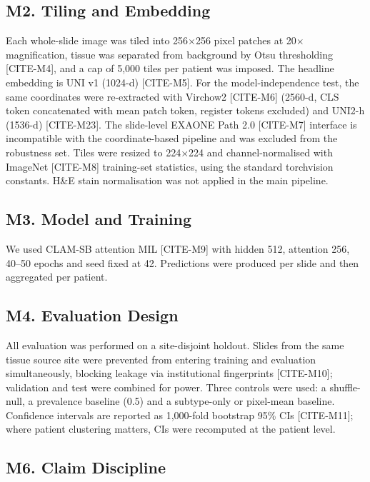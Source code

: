 \subsection*{M2. Tiling and Embedding}

Each whole-slide image was tiled into 256$\times$256 pixel patches at 20$\times$ magnification, tissue was separated from background by Otsu thresholding [CITE-M4], and a cap of 5,000 tiles per patient was imposed. The headline embedding is UNI v1 (1024-d) [CITE-M5]. For the model-independence test, the same coordinates were re-extracted with Virchow2 [CITE-M6] (2560-d, CLS token concatenated with mean patch token, register tokens excluded) and UNI2-h (1536-d) [CITE-M23]. The slide-level EXAONE Path 2.0 [CITE-M7] interface is incompatible with the coordinate-based pipeline and was excluded from the robustness set. Tiles were resized to 224$\times$224 and channel-normalised with ImageNet [CITE-M8] training-set statistics, using the standard torchvision constants. H\&E stain normalisation was not applied in the main pipeline.

\subsection*{M3. Model and Training}

We used CLAM-SB attention MIL [CITE-M9] with hidden 512, attention 256, 40--50 epochs and seed fixed at 42. Predictions were produced per slide and then aggregated per patient.

\subsection*{M4. Evaluation Design}

All evaluation was performed on a site-disjoint holdout. Slides from the same tissue source site were prevented from entering training and evaluation simultaneously, blocking leakage via institutional fingerprints [CITE-M10]; validation and test were combined for power. Three controls were used: a shuffle-null, a prevalence baseline (0.5) and a subtype-only or pixel-mean baseline. Confidence intervals are reported as 1,000-fold bootstrap 95\% CIs [CITE-M11]; where patient clustering matters, CIs were recomputed at the patient level.

\subsection*{M6. Claim Discipline}

